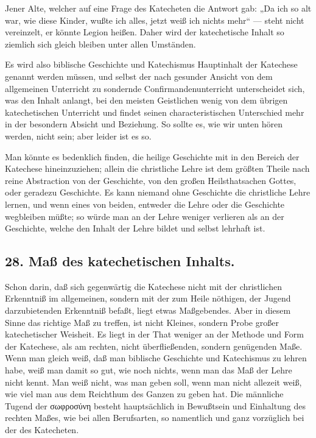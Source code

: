 Jener Alte, welcher auf eine Frage des Katecheten die Antwort gab: „Da ich so alt war, wie diese Kinder, wußte ich alles, jetzt weiß ich nichts mehr“ — steht nicht vereinzelt, er könnte Legion heißen. Daher wird der katechetische Inhalt so ziemlich sich gleich bleiben unter allen Umständen.

Es wird also biblische Geschichte und Katechismus Hauptinhalt der Katechese genannt werden müssen, und selbst der nach gesunder Ansicht von dem allgemeinen Unterricht zu sondernde Confirmandenunterricht unterscheidet sich, was den Inhalt anlangt, bei den meisten Geistlichen wenig von dem übrigen katechetischen Unterricht und findet seinen characteristischen Unterschied mehr in der besondern Absicht und Beziehung. So sollte es, wie wir unten hören werden, nicht sein; aber leider ist es so.

Man könnte es bedenklich finden, die heilige Geschichte mit in den Bereich der Katechese hineinzuziehen; allein die christliche Lehre ist dem größten Theile nach reine Abstraction von der Geschichte, von den großen Heilsthatsachen Gottes, oder geradezu Geschichte. Es kann niemand ohne Geschichte die christliche Lehre lernen, und wenn eines von beiden, entweder die Lehre oder die Geschichte wegbleiben müßte; so würde man an der Lehre weniger verlieren als an der Geschichte, welche den Inhalt der Lehre bildet und selbst lehrhaft ist.

\subsection*{28. Maß des katechetischen Inhalts.}

Schon darin, daß sich gegenwärtig die Katechese nicht mit der christlichen Erkenntniß im allgemeinen, sondern mit der zum Heile nöthigen, der Jugend darzubietenden Erkenntniß befaßt, liegt etwas Maßgebendes. Aber in diesem Sinne das richtige Maß zu treffen, ist nicht Kleines, sondern Probe großer katechetischer Weisheit. Es liegt in der That weniger an der Methode und Form der Katechese, als am rechten, nicht überfließenden, sondern genügenden Maße. Wenn man gleich weiß, daß man biblische Geschichte und Katechismus zu lehren habe, weiß man damit so gut, wie noch nichts, wenn man das Maß der Lehre nicht kennt. Man weiß nicht, was man geben soll, wenn man nicht allezeit weiß, wie viel man aus dem Reichthum des Ganzen zu geben hat. Die männliche Tugend der σωφροσύνη besteht hauptsächlich in Bewußtsein und Einhaltung des rechten Maßes, wie bei allen Berufsarten, so namentlich und ganz vorzüglich bei der des Katecheten.

